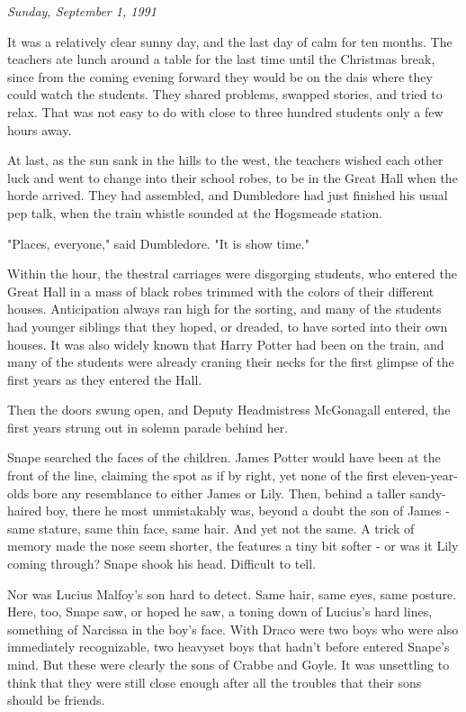 \documentclass[a4paper,11pt]{article}
\begin{document}
\emph{Sunday, September 1, 1991}

It was a relatively clear sunny day, and the last day of calm for ten months. The teachers ate lunch around a table for the last time until the Christmas break, since from the coming evening forward they would be on the dais where they could watch the students. They shared problems, swapped stories, and tried to relax. That was not easy to do with close to three hundred students only a few hours away.

At last, as the sun sank in the hills to the west, the teachers wished each other luck and went to change into their school robes, to be in the Great Hall when the horde arrived. They had assembled, and Dumbledore had just finished his usual pep talk, when the train whistle sounded at the Hogsmeade station.

"Places, everyone," said Dumbledore. "It is show time."

Within the hour, the thestral carriages were disgorging students, who entered the Great Hall in a mass of black robes trimmed with the colors of their different houses. Anticipation always ran high for the sorting, and many of the students had younger siblings that they hoped, or dreaded, to have sorted into their own houses. It was also widely known that Harry Potter had been on the train, and many of the students were already craning their necks for the first glimpse of the first years as they entered the Hall.

Then the doors swung open, and Deputy Headmistress McGonagall entered, the first years strung out in solemn parade behind her.

Snape searched the faces of the children. James Potter would have been at the front of the line, claiming the spot as if by right, yet none of the first eleven-year-olds bore any resemblance to either James or Lily. Then, behind a taller sandy-haired boy, there he most unmistakably was, beyond a doubt the son of James - same stature, same thin face, same hair. And yet not the same. A trick of memory made the nose seem shorter, the features a tiny bit softer - or was it Lily coming through? Snape shook his head. Difficult to tell.

Nor was Lucius Malfoy's son hard to detect. Same hair, same eyes, same posture. Here, too, Snape saw, or hoped he saw, a toning down of Lucius's hard lines, something of Narcissa in the boy's face. With Draco were two boys who were also immediately recognizable, two heavyset boys that hadn't before entered Snape's mind. But these were clearly the sons of Crabbe and Goyle. It was unsettling to think that they were still close enough after all the troubles that their sons should be friends.
\end{document}
